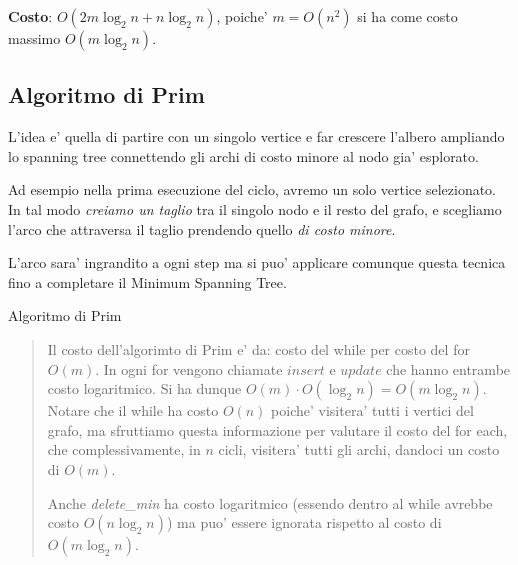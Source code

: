 \documentclass{article}
\begin{document}
\textbf{Costo}: $O(2m \log_2 n + n \log_2 n)$, poiche' $m = O(n^2)$ si ha come
costo massimo $O(m \log_2 n)$.

\subsection{Algoritmo di Prim}

L'idea e' quella di partire con un singolo vertice e far crescere l'albero
ampliando lo spanning tree connettendo gli archi di costo minore al nodo
gia' esplorato.

Ad esempio nella prima esecuzione del ciclo, avremo un solo vertice selezionato.
In tal modo \emph{creiamo un taglio} tra il singolo nodo e il resto del grafo,
e scegliamo l'arco che attraversa il taglio prendendo quello \emph{di costo minore}.

L'arco sara' ingrandito a ogni step ma si puo' applicare comunque questa tecnica
fino a completare il Minimum Spanning Tree.

\begin{algorithm}[H]
  \caption{Algoritmo di Prim}
\end{algorithm}

\begin{quote}
  Il costo dell'algorimto di Prim e' da: costo del while per costo del for $O(m)$.
  In ogni for vengono chiamate $insert$ e $update$ che hanno entrambe costo logaritmico.
  Si ha dunque $O(m) \cdot O(\log_2 n) = O(m \log_2 n)$.
  Notare che il while ha costo $O(n)$ poiche' visitera' tutti i vertici del grafo,
  ma sfruttiamo questa informazione per valutare il costo del for each, che
  complessivamente, in $n$ cicli, visitera' tutti gli archi, dandoci un costo di $O(m)$.

  Anche \emph{delete\_min} ha costo logaritmico (essendo dentro al while avrebbe
  costo $O(n \log_2 n)$) ma puo' essere ignorata rispetto al costo di $O(m\log_2n)$.
\end{quote}
\end{document}
